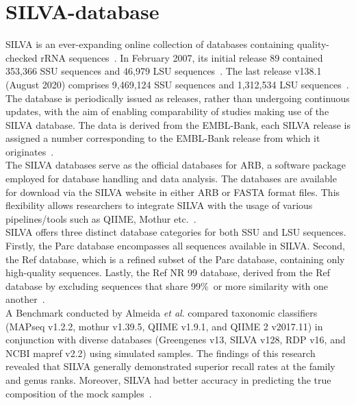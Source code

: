 \section{SILVA-database}\label{sec:SILVA}
SILVA is an ever-expanding online collection of databases containing quality-checked rRNA sequences~\cite{quast_silva_2013}. In February 2007, its initial release 89 contained 353,366 SSU sequences and 46,979 LSU sequences~\cite{noauthor_release_nodate-1}. The last release v138.1 (August 2020) comprises 9,469,124 SSU sequences and 1,312,534 LSU sequences~\cite{noauthor_release_nodate}. The database is periodically issued as releases, rather than undergoing continuous updates, with the aim of enabling comparability of studies making use of the SILVA database. The data is derived from the EMBL-Bank, each SILVA release is assigned a number corresponding to the EMBL-Bank release from which it originates~\cite{quast_silva_2013}. 
\\
The SILVA databases serve as the official databases for ARB, a software package  employed for database handling and data analysis. The databases are available for download via the SILVA website in either ARB or FASTA format files. This flexibility allows researchers to integrate SILVA with the usage of various pipelines/tools such as QIIME, Mothur etc.~\cite{quast_silva_2013}.
\\
SILVA offers three distinct database categories for both SSU and LSU sequences. Firstly, the Parc database encompasses all sequences available in SILVA. Second, the Ref database, which is a refined subset of the Parc database, containing only high-quality sequences. Lastly, the Ref NR 99 database, derived from the Ref database by excluding sequences that share 99\%\ or more similarity with one another~\cite{noauthor_release_nodate}.
\\
A Benchmark conducted by Almeida \emph{et al}. compared taxonomic classifiers (MAPseq v1.2.2, mothur v1.39.5, QIIME v1.9.1, and QIIME 2 v2017.11) in conjunction with diverse databases (Greengenes v13, SILVA v128, RDP v16, and NCBI mapref v2.2) using simulated samples. The findings of this research revealed that SILVA generally demonstrated superior recall rates at the family and genus ranks. Moreover, SILVA had better accuracy in predicting the true composition of the mock samples~\cite{almeida_benchmarking_2018}.